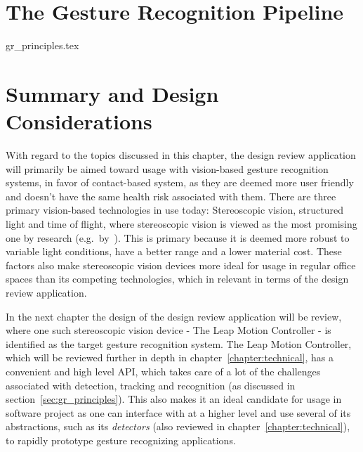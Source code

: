 \section{The Gesture Recognition Pipeline}
\label{sec:gr_principles}
{gr_principles.tex}


\section{Summary and Design Considerations}
\label{sec:gesture_design_considerations}
With regard to the topics discussed in this chapter, the design review application will primarily be aimed toward usage with vision-based gesture recognition
systems, in favor of contact-based system, as they are deemed more user friendly and doesn't have the same health risk associated with them.
There are three primary vision-based technologies in use today: Stereoscopic vision, structured light and time of flight, where stereoscopic vision is 
viewed as the most promising one by research (e.g.~by~\citet{Ko2012}). This is primary because it is deemed more robust to variable light conditions, have 
a better range and a lower material cost. These factors also make stereoscopic vision devices more ideal for usage in regular office spaces than its competing technologies, 
which in relevant in terms of the design review application. 

In the next chapter the design of the design review application will be review, where one such stereoscopic vision device - The Leap Motion Controller - is identified as the target
gesture recognition system. The Leap Motion Controller, which will be reviewed further in depth in chapter~\ref{chapter:technical}, has a convenient and high
level API, which takes care of a lot of the challenges associated with detection, tracking and recognition (as discussed in section~\vref{sec:gr_principles}). 
This also makes it an ideal candidate for usage in software project as one can interface with at a higher level and use several of its abstractions, 
such as its \textit{detectors} (also reviewed in chapter~\ref{chapter:technical}), to rapidly prototype gesture recognizing applications. 


